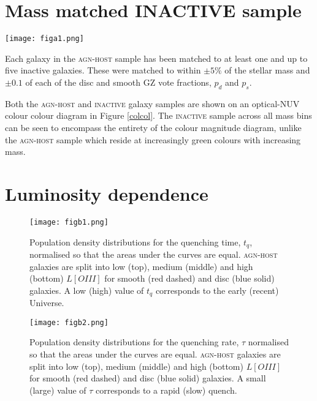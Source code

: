 \documentclass[useAMS,usenatbib]{mn2e}
\def\changedbds    {\color{ncc} }
\def\secondchange    {\color{srv} }
\begin{document}
\appendix

\section{Mass matched INACTIVE sample}

\begin{figure*}
\texttt{[image: figa1.png]}
\caption{Optical-NUV colour-colour contour diagrams for the \textsc{agn-host} (top) and \textsc{inactive} galaxy samples split into low (blue), medium (green) and high (red) stellar mass samples. Underlaying each diagram are the contours of the \textsc{gz2-galex} sample (grey).}
\label{colcol}
\end{figure*}

Each galaxy in the \textsc{agn-host} sample has been matched to at least one and up to five inactive galaxies. These were matched to within $\pm5\%$ of the stellar mass and $\pm 0.1$ of each of the disc and smooth GZ vote fractions, $p_d$ and $p_s$.

Both the \textsc{agn-host} and \textsc{inactive} galaxy samples are shown on an optical-NUV colour colour diagram in Figure \ref{colcol}. The \textsc{inactive} sample across all mass bins can be seen to encompass the entirety of the colour magnitude diagram, unlike the \textsc{agn-host} sample which reside at increasingly green colours with increasing mass. 


\section{Luminosity dependence}

\begin{figure}
\texttt{[image: figb1.png]}
\caption{{\secondchange Population density} distributions for the quenching time, $t_q$, {\changedbds normalised so that the areas under the curves are equal}. \textsc{agn-host} galaxies are split into low (top), medium (middle) and high (bottom)  $L[OIII]$ for smooth (red dashed) and disc (blue solid) galaxies. A low (high) value of $t_q$ corresponds to the early (recent) Universe.}
\label{loiiitime}
\end{figure}

\begin{figure}
\texttt{[image: figb2.png]}
\caption{{\secondchange Population density} distributions for the quenching rate, $\tau$ normalised so that the areas under the curves are equal. \textsc{agn-host} galaxies are split into low (top), medium (middle) and high (bottom) $L[OIII]$ for smooth (red dashed) and disc (blue solid) galaxies. A small (large) value of $\tau$ corresponds to a rapid (slow) quench.}
\label{loiiirate}
\end{figure}
\end{document}
